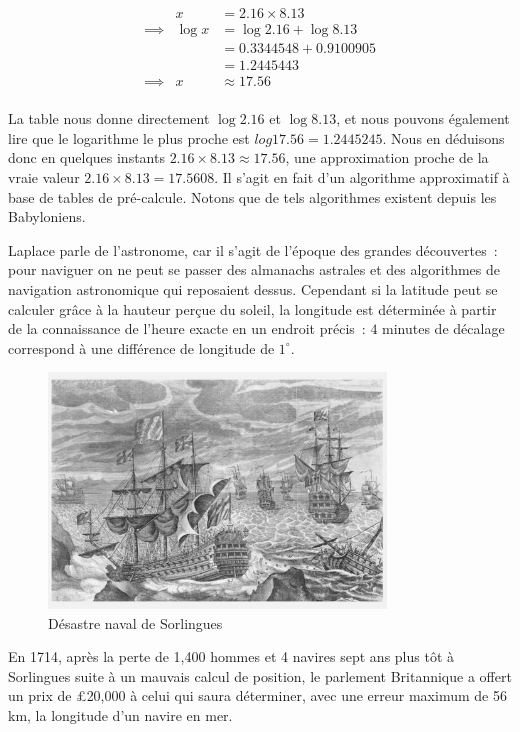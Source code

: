 \begin{eqnarray}
                    &x            &= 2.16\times{8.13}              \nonumber \\
        \implies{}  &\log{x}      &= \log{2.16}+\log{8.13}         \nonumber \\
                    &             &= 0.3344548 + 0.9100905         \nonumber \\
                    &             &= 1.2445443                     \nonumber \\
        \implies{}  &x            &\approx{17.56}                   \nonumber \\
\end{eqnarray}

La table nous donne directement $\log{2.16}$ et $\log{8.13}$, et nous pouvons également lire que le logarithme le plus proche est $log{17.56} = 1.2445245$. Nous en déduisons donc en quelques instants $2.16\times{8.13} \approx{17.56}$, une approximation proche de la vraie valeur $2.16\times{8.13}={17.5608}$. Il s'agit en fait d'un algorithme approximatif à base de tables de pré-calcule. Notons que de tels algorithmes existent depuis les Babyloniens\cite{robson-math}.

Laplace parle de l'astronome, car il s'agit de l'époque des grandes découvertes~: pour naviguer on ne peut se passer des almanachs astrales et des algorithmes de navigation astronomique qui reposaient dessus. Cependant si la latitude peut se calculer grâce à la hauteur perçue du soleil, la longitude est déterminée à partir de la connaissance de l'heure exacte en un endroit précis~: $4$ minutes de décalage correspond à une différence de longitude de $1^{\circ}$.  

\begin{minipage}[H]{0.59\linewidth}
  \begin{figure}[H]
  \centering
  \includegraphics[width=0.8\textwidth]{../resources/illustrations/scilly1707}
  \caption{Désastre naval de Sorlingues}
  \end{figure}
\end{minipage}
\begin{minipage}[H]{0.39\linewidth}
En 1714, après la perte de 1,400 hommes et 4 navires sept ans plus tôt à Sorlingues suite à un mauvais calcul de position, le parlement Britannique a offert un prix de \pounds{20,000} à celui qui saura déterminer, avec une erreur maximum de 56 km, la longitude d'un navire en mer\cite{longitude}. 
\end{minipage}

